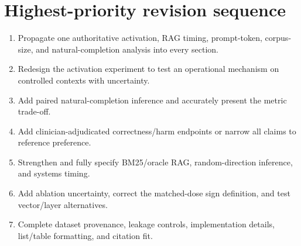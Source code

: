 \documentclass[11pt]{article}
\begin{document}
\section*{Highest-priority revision sequence}

\begin{enumerate}
    \item Propagate one authoritative activation, RAG timing, prompt-token, corpus-size, and natural-completion analysis into every section.
    \item Redesign the activation experiment to test an operational mechanism on controlled contexts with uncertainty.
    \item Add paired natural-completion inference and accurately present the metric trade-off.
    \item Add clinician-adjudicated correctness/harm endpoints or narrow all claims to reference preference.
    \item Strengthen and fully specify BM25/oracle RAG, random-direction inference, and systems timing.
    \item Add ablation uncertainty, correct the matched-dose sign definition, and test vector/layer alternatives.
    \item Complete dataset provenance, leakage controls, implementation details, list/table formatting, and citation fit.
\end{enumerate}
\end{document}
